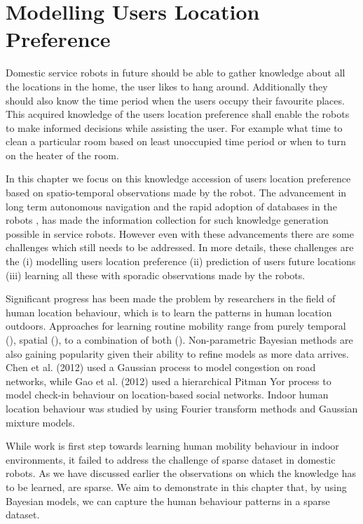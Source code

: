 \chapter{Modelling Users Location Preference }
\label{chapter:Human location}
Domestic service robots in future should be able to gather knowledge about all the locations in the home, the user likes to hang around. Additionally they should also know the time period when the users occupy their favourite places. This acquired knowledge of the users location preference shall enable the robots to make informed decisions while assisting the user. For example what time to clean a particular room based on least unoccupied time period or when to turn on the heater of the room. 

In this chapter we focus on this knowledge accession of users location preference based on spatio-temporal observations made by the robot. The advancement in long term autonomous navigation \cite{krajnik_life-long_2015} and the rapid adoption of databases in the robots \cite{niemueller2012generic}, has made the information collection for such knowledge generation possible in service robots. However even with these advancements there are some challenges which still needs to be addressed.  In more details, these challenges are the (i) modelling users location preference (ii) prediction of users future locations (iii) learning all these with sporadic observations made by the robots. 

Significant progress has been made the problem by researchers in the field of human location behaviour, which is to learn the patterns in human location outdoors. Approaches for learning routine mobility  range from purely temporal (\cite{mcinerney2013modelling, scellato2011nextplace}), spatial (\cite{gao2012exploring,song2006evaluating}), to a combination  of  both  (\cite{eagle2009eigenbehaviors}). Non-parametric Bayesian methods are also gaining popularity given their ability to refine models as more data arrives. Chen et al. (2012) used a Gaussian process to model congestion on road networks, while Gao et al. (2012) used a hierarchical Pitman Yor process to model check-in behaviour on location-based social networks. Indoor human location behaviour was studied by \cite{krajnik_wheres_2015} using Fourier transform methods and Gaussian mixture models. 

While \cite{krajnik_wheres_2015}  work is first step towards learning human mobility behaviour in indoor environments, it failed to address the challenge of sparse dataset in domestic robots. As we have discussed earlier the observations on which the knowledge has to be learned, are sparse. We aim to demonstrate in this chapter that, by using Bayesian models, we can capture the human behaviour patterns in a sparse dataset.

